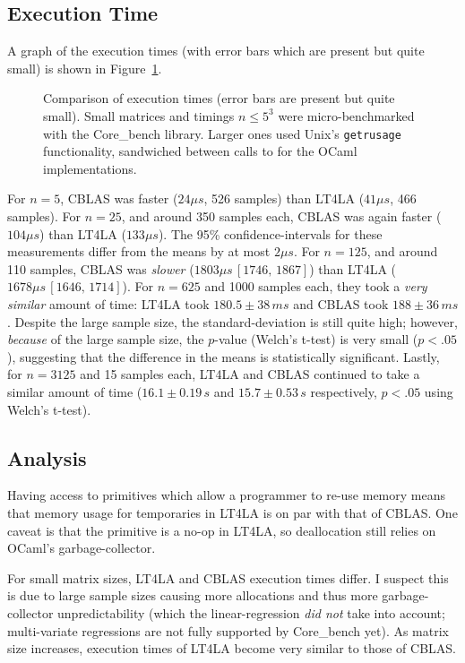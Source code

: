 \subsection{Execution Time}

A graph of the execution times (with error bars which are present but quite
small) is shown in Figure~\ref{fig:timings}.

\begin{figure}[t]
    \centering
    
    \caption{Comparison of execution times (error bars are present but quite
        small). Small matrices and timings $n \le 5^3$ were micro-benchmarked
        with the Core\_bench library. Larger ones used Unix's
        \texttt{getrusage} functionality, sandwiched between calls to
         for the OCaml implementations.}\label{fig:timings}
\end{figure}

For $n=5$, CBLAS was faster ($24\mu s$, 526 samples) than LT4LA ($41 \mu s$,
466 samples).  For $n=25$, and around 350 samples each, CBLAS was again faster
($104 \mu s$) than LT4LA ($133 \mu s$). The 95\% confidence-intervals for these
measurements differ from the means by at most $2 \mu s$. For $n=125$, and
around 110 samples, CBLAS was \emph{slower} ($1803 \mu s\, [1746,\, 1867]$)
than LT4LA ($1678 \mu s\, [1646,\, 1714]$). For $n=625$ and 1000 samples each,
they took a \emph{very similar} amount of time: LT4LA took $180.5 \pm 38 \,ms$
and CBLAS took $188 \pm 36 \, ms$. Despite the large sample size, the
standard-deviation is still quite high; however, \emph{because} of the large
sample size, the $p$-value (Welch's t-test) is very small ($p < .05$),
suggesting that the difference in the means is statistically significant.
Lastly, for $n=3125$ and 15 samples each, LT4LA and CBLAS continued to take a
similar amount of time ($16.1 \pm 0.19 \,s$ and $15.7 \pm 0.53 \,s$
respectively, $p<.05$ using Welch's t-test).

\subsection{Analysis}

Having access to primitives which allow a programmer to re-use memory means
that memory usage for temporaries in LT4LA is on par with that of CBLAS. One
caveat is that the  primitive is a no-op in LT4LA, so deallocation
still relies on OCaml's garbage-collector.

For small matrix sizes, LT4LA and CBLAS execution times differ. I suspect this
is due to large sample sizes causing more allocations and thus more
garbage-collector unpredictability (which the linear-regression \emph{did not}
take into account; multi-variate regressions are not fully supported by
Core\_bench yet). As matrix size increases, execution times of LT4LA become
very similar to those of CBLAS.

